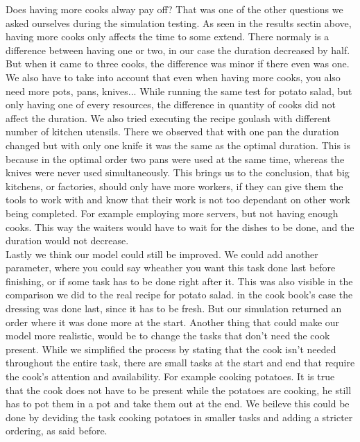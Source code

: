 Does having more cooks alway pay off? That was one of the other questions we asked ourselves during the simulation testing. As seen
in the results sectin above, having more cooks only affects the time to some extend. There normaly is a difference between having one or two, 
in our case the duration decreased by half. But when it came to three cooks, the difference was minor if there even was one. 
We also have to take into account that even when having more cooks, you also need more pots, pans, knives... While running the same test for potato salad, 
but only having one of every resources, the difference in quantity of cooks did not affect the duration. We also tried executing the recipe goulash
with different number of kitchen utensils. There we observed that with one pan the duration changed but with only one knife it was the same as the optimal duration.
This is because in the optimal order two pans were used at the same time, whereas the knives were never used simultaneously.  
This brings us to the conclusion, that big kitchens, or factories, should only have more workers, if they can give them the tools to work with and know that 
their work is not too dependant on other work being completed. For example employing more servers, but not having enough cooks. 
This way the waiters would have to wait for the dishes to be done, and the duration would not decrease. \\

Lastly we think our model could still be improved. We could add another parameter, 
where you could say wheather you want this task done last before finishing, or if some task has to be done right after it.
This was also visible in the comparison we did to the real recipe for potato salad. in the cook book's case 
the dressing was done last, since it has to be fresh. But our simulation returned an order where it was done more at the start.
Another thing that could make our model more realistic, would be to change the tasks that don't need the cook present. 
While we simplified the process by stating that the cook isn't needed throughout the entire task, 
there are small tasks at the start and end that require the cook's attention and availability. For example cooking potatoes. 
It is true that the cook does not have to be present while the potatoes are cooking, he still has to pot them in a pot and take them out at the end.
We beileve this could be done by deviding the task cooking potatoes in smaller tasks and adding a stricter ordering, as said before.
